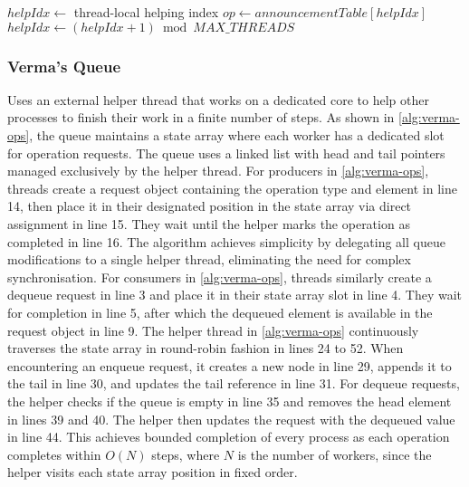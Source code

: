 \begin{algorithm}[!ht]
\begin{algorithmic}[1]
        \State
        
            \State {}
            \State $helpIdx \gets $ thread-local helping index
            \State $op \gets announcementTable[helpIdx]$
                    \State {}
                \Else
                    \State {}
                \EndIf
            \EndIf
            \State $helpIdx \gets (helpIdx + 1) \bmod MAX\_THREADS$
        \EndFunction
    \end{algorithmic}
\end{algorithm}

\subsubsection{Verma's Queue}\label{subsubsec:verma-queue}
Uses an external helper thread that works on a dedicated core to help other processes to finish their work in a finite number of steps. As shown in \cref{alg:verma-ops}, the queue maintains a state array where each worker has a dedicated slot for operation requests. The queue uses a linked list with head and tail pointers managed exclusively by the helper thread. For producers in \cref{alg:verma-ops}, threads create a request object containing the operation type and element in line 14, then place it in their designated position in the state array via direct assignment in line 15. They wait until the helper marks the operation as completed in line 16. The algorithm achieves simplicity by delegating all queue modifications to a single helper thread, eliminating the need for complex synchronisation. For consumers in \cref{alg:verma-ops}, threads similarly create a dequeue request in line 3 and place it in their state array slot in line 4. They wait for completion in line 5, after which the dequeued element is available in the request object in line 9. The helper thread in \cref{alg:verma-ops} continuously traverses the state array in round-robin fashion in lines 24 to 52. When encountering an enqueue request, it creates a new node in line 29, appends it to the tail in line 30, and updates the tail reference in line 31. For dequeue requests, the helper checks if the queue is empty in line 35 and removes the head element in lines 39 and 40. The helper then updates the request with the dequeued value in line 44. This achieves bounded completion of every process as each operation completes within $O(N)$ steps, where $N$ is the number of workers, since the helper visits each state array position in fixed order. \cite{Verma2013Scalable}

